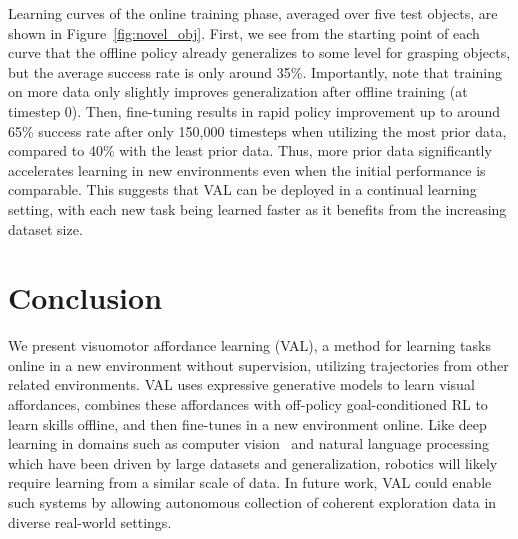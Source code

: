 Learning curves of the online training phase, averaged over five test objects, are shown in Figure~\ref{fig:novel_obj}. 
First, we see from the starting point of each curve that the offline policy already generalizes to some level for grasping objects, but the average success rate is only around 35\%. 
Importantly, note that training on more data only slightly improves generalization after offline training (at timestep 0).
Then, fine-tuning results in rapid policy improvement up to around 65\% success rate after only 150,000 timesteps when utilizing the most prior data, compared to 40\% with the least prior data.
Thus, more prior data significantly accelerates learning in new environments even when the initial performance is comparable.
This suggests that VAL can be deployed in a continual learning setting, with each new task being learned faster as it benefits from the increasing dataset size.



\section{Conclusion}
\label{sec:conclusion}

We present visuomotor affordance learning (VAL), a method for learning tasks online in a new environment without supervision, utilizing trajectories from other related environments. VAL uses expressive generative models to learn visual affordances, combines these affordances with off-policy goal-conditioned RL to learn skills offline, and then fine-tunes in a new environment online. Like deep learning in domains such as computer vision~\cite{krizhevsky2012imagenet} and natural language processing~\cite{devlin2019bert} which have been driven by large datasets and generalization, robotics will likely require learning from a similar scale of data. In future work, VAL could enable such systems by allowing autonomous collection of coherent exploration data in diverse real-world settings.

